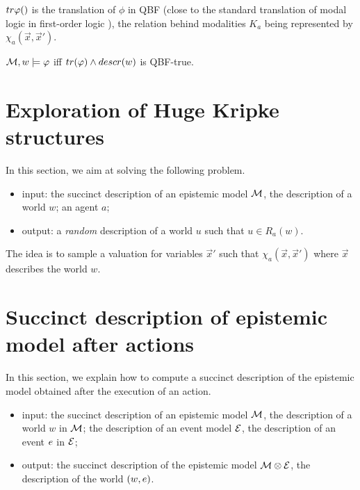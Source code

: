 \documentclass{article}
\begin{document}
$\trmltoqbf\phi$ is the translation of $\phi$ in QBF (close to the standard translation of modal logic in first-order logic \cite{??} ), the relation behind modalities $K_a$ being represented by $\chi_a(\vec x, \vec x')$.


\begin{theorem}
	$\mathcal M, w \models \varphi$ iff $tr(\varphi) \land descr(w)$ is QBF-true.
\end{theorem}


\section{Exploration of Huge Kripke structures}


In this section, we aim at solving the following problem.

\begin{itemize}
	\item input: the succinct description of an epistemic model $\mathcal M$, the description of a world $w$; an agent $a$;
	\item output: a \emph{random} description of a world $u$ such that $u \in R_a(w)$.
\end{itemize}

The idea is to sample a valuation for variables $\vec x'$ such that $\chi_a(\vec x, \vec x')$ where $\vec x$ describes the world $w$.



\section{Succinct description of epistemic model after actions}

In this section, we explain how to compute a succinct description of the epistemic model obtained after the execution of an action. 

\begin{itemize}
	\item input: the succinct description of an epistemic model $\mathcal M$, the description of a world $w$ in $\mathcal M$; the description of an event model $\mathcal E$, the description of an event $e$ in $\mathcal E$;
	\item output: the succinct description of the epistemic model $\mathcal M \otimes \mathcal E$, the description of the world $(w, e)$.
\end{itemize}
\end{document}
